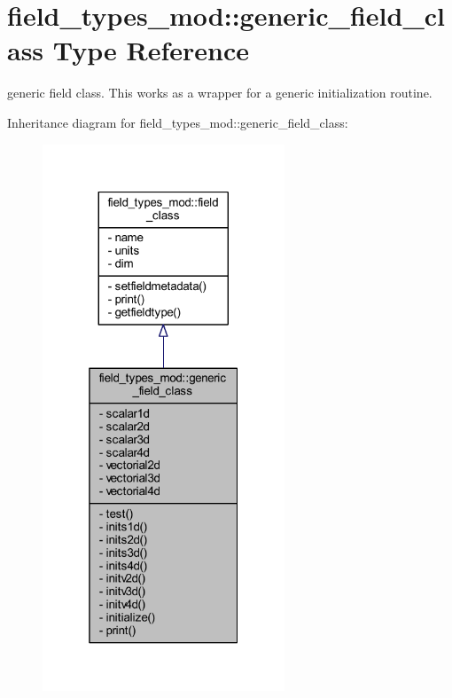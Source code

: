 \hypertarget{structfield__types__mod_1_1generic__field__class}{}\section{field\+\_\+types\+\_\+mod\+:\+:generic\+\_\+field\+\_\+class Type Reference}
\label{structfield__types__mod_1_1generic__field__class}


generic field class. This works as a wrapper for a generic initialization routine.  




Inheritance diagram for field\+\_\+types\+\_\+mod\+:\+:generic\+\_\+field\+\_\+class\+:
\nopagebreak
\begin{figure}[H]
\begin{center}
\leavevmode
\includegraphics[width=205pt]{structfield__types__mod_1_1generic__field__class__inherit__graph}
\end{center}
\end{figure}


